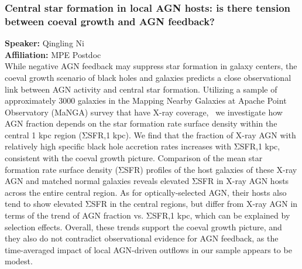 \subsubsection*{Central star formation in local AGN hosts: is there tension between coeval growth and AGN feedback?}
\textbf{Speaker:} Qingling Ni \\
\textbf{Affiliation:} MPE \textperiodcentered{} Postdoc\\
While negative AGN feedback may suppress star formation in galaxy centers, the coeval growth scenario of black holes and galaxies predicts a close observational link between AGN activity and central star formation. Utilizing a sample of approximately 3000 galaxies in the Mapping Nearby Galaxies at Apache Point Observatory (MaNGA) survey that have X-ray coverage,  we investigate how AGN fraction depends on the star formation rate surface density within the central 1 kpc region (ΣSFR,1 kpc). We find that the fraction of X-ray AGN with relatively high specific black hole accretion rates increases with ΣSFR,1 kpc, consistent with the coeval growth picture. Comparison of the mean star formation rate surface density (ΣSFR) profiles of the host galaxies of these X-ray AGN and matched normal galaxies reveals elevated ΣSFR in X-ray AGN hosts across the entire central region. As for optically-selected AGN, their hosts also tend to show elevated ΣSFR in the central regions, but differ from X-ray AGN in terms of the trend of AGN fraction vs. ΣSFR,1 kpc, which can be explained by selection effects. Overall, these trends support the coeval growth picture, and they also do not contradict observational evidence for AGN feedback, as the time-averaged impact of local AGN-driven outflows in our sample appears to be modest.

\hypertarget{abs-40}{}
